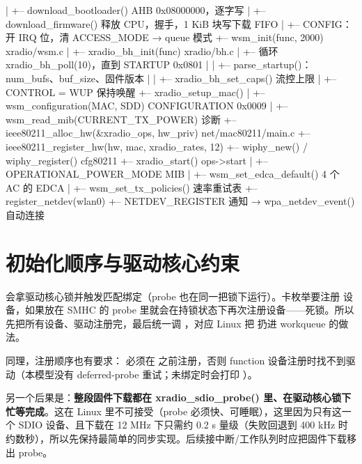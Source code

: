 \begin{txtcode}[basicstyle=\ttfamily\scriptsize]
                    |   +-- download_bootloader()   AHB 0x08000000，逐字写
                    |   +-- download_firmware()     释放 CPU，握手，1 KiB 块写下载 FIFO
                    |   +-- CONFIG：开 IRQ 位，清 ACCESS_MODE → queue 模式
                    +-- wsm_init(func, 2000)                         xradio/wsm.c
                    |   +-- xradio_bh_init(func)                     xradio/bh.c
                    |   +-- 循环 xradio_bh_poll(10)，直到 STARTUP 0x0801
                    |   |   +-- parse_startup()：num_bufs、buf_size、固件版本
                    |   |       +-- xradio_bh_set_caps()              流控上限
                    |   +-- CONTROL = WUP                            保持唤醒
                    +-- xradio_setup_mac()
                    |   +-- wsm_configuration(MAC, SDD)              CONFIGURATION 0x0009
                    |   +-- wsm_read_mib(CURRENT_TX_POWER)           诊断
                    +-- ieee80211_alloc_hw(&xradio_ops, hw_priv)     net/mac80211/main.c
                    +-- ieee80211_register_hw(hw, mac, xradio_rates, 12)
                        +-- wiphy_new() / wiphy_register()           cfg80211
                        +-- xradio_start()                           ops->start
                        |   +-- OPERATIONAL_POWER_MODE MIB
                        |   +-- wsm_set_edca_default()               4 个 AC 的 EDCA
                        |   +-- wsm_set_tx_policies()                速率重试表
                        +-- register_netdev(wlan0)
                            +-- NETDEV_REGISTER 通知 → wpa_netdev_event()   自动连接
\end{txtcode}

\section{初始化顺序与驱动核心约束}

 会拿驱动核心锁并触发匹配绑定（probe 也在同一把锁下运行）。卡枚举要注册  设备，如果放在 SMHC 的 probe 里就会在持锁状态下再次注册设备——死锁。所以  先把所有设备、驱动注册完，最后统一调 ，对应 Linux 把  扔进 workqueue 的做法。

同理，注册顺序也有要求： 必须在  之前注册，否则 function 设备注册时找不到驱动（本模型没有 deferred-probe 重试；未绑定时会打印 ）。

另一个后果是：\textbf{整段固件下载都在 xradio\_sdio\_probe() 里、在驱动核心锁下忙等完成}。这在 Linux 里不可接受（probe 必须快、可睡眠），这里因为只有这一个 SDIO 设备、且下载在 12 MHz 下只需约 0.2 s 量级（失败回退到 400 kHz 时约数秒），所以先保持最简单的同步实现。后续接中断/工作队列时应把固件下载移出 probe。

